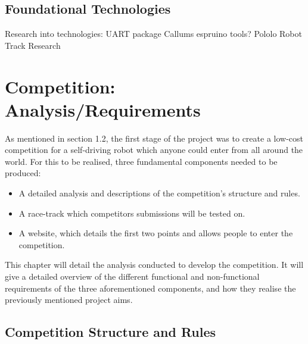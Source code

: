 \documentclass{l4proj}
\begin{document}
\section{Foundational Technologies}
Research into technologies:
UART package
Callums espruino tools?
Pololo Robot
Track Research


\chapter{Competition: Analysis/Requirements}
As mentioned in section 1.2, the first stage of the project was to create a low-cost competition for a self-driving robot which anyone could enter from all around the world.
For this to be realised, three fundamental components needed to be produced:
\begin{itemize}
    \item A detailed analysis and descriptions of the competition's structure and rules.
    \item A race-track which competitors submissions will be tested on.
    \item A website, which details the first two points and allows people to enter the competition.
\end{itemize}
This chapter will detail the analysis conducted to develop the competition. It will give a detailed overview of the different functional and non-functional requirements of the three aforementioned components, and how they realise the previously mentioned project aims.

\section{Competition Structure and Rules}
\end{document}

